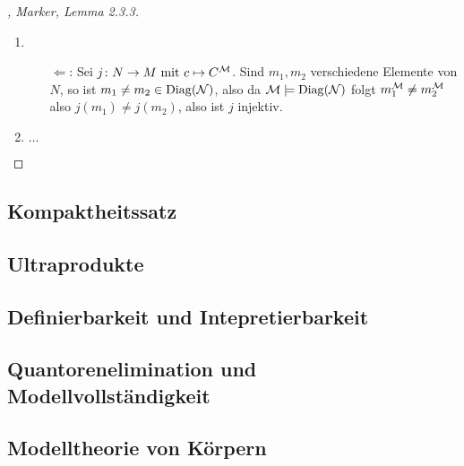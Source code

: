 \begin{proof}[, Marker, Lemma 2.3.3]
	\begin{enumerate}
		\item \begin{itemize}
			\item[$\Longleftarrow$:] Sei $j \colon N \to M \text{ mit } c \mapsto C^{\mathcal M}$. Sind $m_1, m_2$ verschiedene Elemente von $N$, so ist $m_1 \neq m_2 \in \operatorname{Diag}(\mathcal N)$, also da $\mathcal M \models \operatorname{Diag}(\mathcal N)$ folgt $m_1^{\mathcal M} \neq m_2^{\mathcal M}$ also $j(m_1) \neq j(m_2)$, also ist $j$ injektiv.\\
		\end{itemize}
	\item {}
	\begin{*example}
		$\dots$
	\end{*example}
	\end{enumerate}
\end{proof}

\subsection{Kompaktheitssatz}

\subsection{Ultraprodukte}

\subsection{Definierbarkeit und Intepretierbarkeit}

\subsection{Quantorenelimination und Modellvollständigkeit}

\subsection{Modelltheorie von Körpern}
